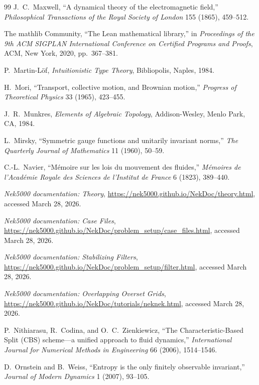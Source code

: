 \begin{thebibliography}{99}
J.~C.~Maxwell,
``A dynamical theory of the electromagnetic field,''
\emph{Philosophical Transactions of the Royal Society of London} 155 (1865), 459--512.

The mathlib Community,
``The Lean mathematical library,''
in \emph{Proceedings of the 9th ACM SIGPLAN International Conference on Certified Programs and Proofs},
ACM, New York, 2020, pp.~367--381.

P.~Martin-L\"of,
\emph{Intuitionistic Type Theory},
Bibliopolis, Naples, 1984.

H.~Mori,
``Transport, collective motion, and Brownian motion,''
\emph{Progress of Theoretical Physics} 33 (1965), 423--455.

J.~R.~Munkres,
\emph{Elements of Algebraic Topology},
Addison-Wesley, Menlo Park, CA, 1984.

L.~Mirsky,
``Symmetric gauge functions and unitarily invariant norms,''
\emph{The Quarterly Journal of Mathematics} 11 (1960), 50--59.

C.-L.~Navier,
``M\'emoire sur les lois du mouvement des fluides,''
\emph{M\'emoires de l'Acad\'emie Royale des Sciences de l'Institut de France}
6 (1823), 389--440.

\emph{Nek5000 documentation: Theory},
\url{https://nek5000.github.io/NekDoc/theory.html},
accessed March 28, 2026.

\emph{Nek5000 documentation: Case Files},
\url{https://nek5000.github.io/NekDoc/problem_setup/case_files.html},
accessed March 28, 2026.

\emph{Nek5000 documentation: Stabilizing Filters},
\url{https://nek5000.github.io/NekDoc/problem_setup/filter.html},
accessed March 28, 2026.

\emph{Nek5000 documentation: Overlapping Overset Grids},
\url{https://nek5000.github.io/NekDoc/tutorials/neknek.html},
accessed March 28, 2026.

P.~Nithiarasu, R.~Codina, and O.~C.~Zienkiewicz,
``The Characteristic-Based Split (CBS) scheme---a unified approach to fluid dynamics,''
\emph{International Journal for Numerical Methods in Engineering} 66 (2006),
1514--1546.

D.~Ornstein and B.~Weiss,
``Entropy is the only finitely observable invariant,''
\emph{Journal of Modern Dynamics} 1 (2007), 93--105.


\end{thebibliography}
